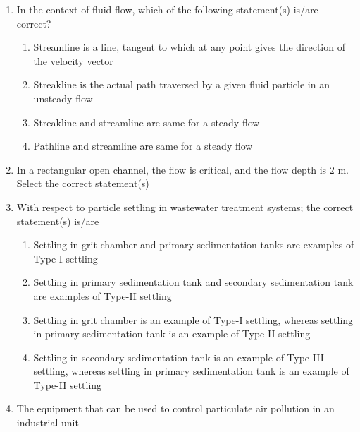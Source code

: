 \documentclass[journal]{IEEEtran}
\numberwithin{equation}{enumi}
\numberwithin{figure}{enumi}
\begin{document}
\begin{enumerate}[start=1, label={Q\arabic*.}]
\begin{enumerate}
  \end{enumerate}
\item In the context of fluid flow, which of the following statement(s) is/are correct? 
\vspace{0.2cm}
\begin{enumerate}
  \item Streamline is a line, tangent to which at any point gives the direction of the
velocity vector
  \item Streakline is the actual path traversed by a given fluid particle in an unsteady flow
  \item Streakline and streamline are same for a steady flow
  \item Pathline and streamline are same for a steady flow
  \end{enumerate}
\item In a rectangular open channel, the flow is critical, and the flow depth is $2$ m. Select the
correct statement(s)
 \begin{enumerate} 
  \end{enumerate}
\item With respect to particle settling in wastewater treatment systems; the correct statement(s)
is/are
 \vspace{0.2cm}
\begin{enumerate}
  \item Settling in grit chamber and primary sedimentation tanks are examples of Type-I settling
  \item Settling in primary sedimentation tank and secondary sedimentation tank are examples of
Type-II settling
  \item Settling in grit chamber is an example of Type-I settling, whereas settling in primary
sedimentation tank is an example of Type-II settling
  \item Settling in secondary sedimentation tank is an example of Type-III settling, whereas
settling in primary sedimentation tank is an example of Type-II settling
  \end{enumerate}
\item The equipment that can be used to control particulate air pollution in an industrial unit

\end{enumerate}
\end{document}

